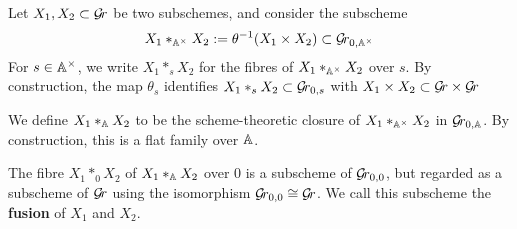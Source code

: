 \documentclass{article} %
\begin{document}
Let $ X_1, X_2 \subset \Gr$ be two subschemes, and consider the subscheme $$ X_1 \ast_{\Cx} X_2 := \theta^{-1}(X_1 \times X_2) \subset \Gr_{0, \AA^\times} $$
% 
For $ s \in \Cx$, we write $ X_1 \ast_s X_2  $ for the fibres of $ X_1 \ast_{\Cx} X_2 $ over $ s$. By construction, the map $ \theta_s$ identifies $ X_1 \ast_s X_2 \subset \Gr_{0,s}$ with $ X_1 \times X_2 \subset \Gr \times \Gr$



We define $ X_1 \ast_{\AA} X_2 $ to be the scheme-theoretic closure of $  X_1 \ast_{\Cx} X_2 $ in $ \Grbd $. By construction, this is a flat family over $ \AA$.

The fibre $ X_1 \ast_0 X_2$ of $ X_1 \ast_{\AA} X_2 $ over $0$ is a subscheme of $ \Gr_{0,0} $, but regarded as a subscheme of $ \Gr $ using {the isomorphism} $\Gr_{0,0} \cong \Gr $.  We call this subscheme the \textbf{fusion} of $ X_1 $ and $ X_2$.

% 
% 

\end{document}
